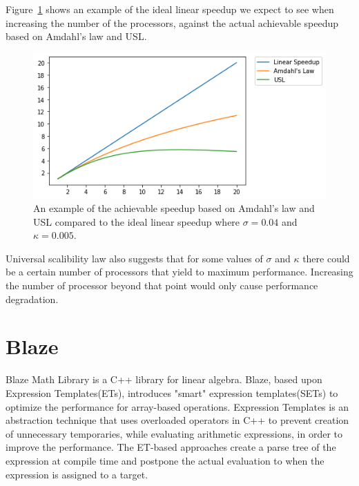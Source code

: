 Figure~\ref{fig_Amdahl} shows an example of the ideal linear speedup we expect to see when increasing the number of the processors, against the actual achievable speedup based on Amdahl's law and USL.

\begin{figure}[H]
	\centering
	\includegraphics[width=1\linewidth]{images/Amdahls.png}
	\caption{An example of the achievable speedup based on Amdahl's law and USL compared to the ideal linear speedup where $\sigma=0.04$ and $\kappa=0.005$.}	
	\label{fig_Amdahl}
\end{figure}

Universal scalibility law also suggests that for some values of $\sigma$ and $\kappa$ there could be a certain number of processors that yield to maximum performance\cite{gunther2007guerrilla}. Increasing the number of processor beyond that point would only cause performance degradation.  
	
\section{Blaze}
Blaze Math Library\cite{iglberger2012expression} is a C++ library for linear algebra. Blaze, based upon Expression Templates(ETs)\cite{veldhuizen1995expression}, introduces "smart" expression templates(SETs)\cite{iglberger2012expression} to optimize the performance for array-based operations. Expression Templates\cite{veldhuizen1995expression} is an abstraction technique that uses overloaded operators in C++ to prevent creation of unnecessary temporaries, while evaluating arithmetic expressions, in order to improve the performance\cite{iglberger2012expression}. The ET-based approaches create a parse tree of the expression at compile time and postpone the actual evaluation to when the expression is assigned to a target. 

